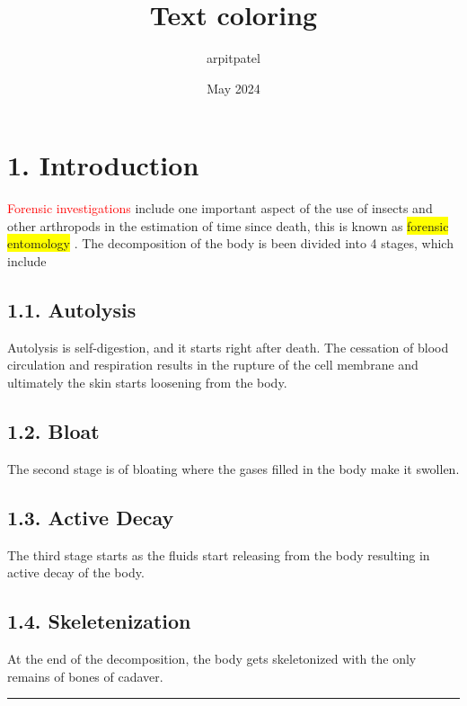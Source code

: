 \documentclass{article}
\title{\textbf{Text coloring}}
\author{arpitpatel }
\date{May 2024}
\begin{document}
\maketitle

\section*{1. Introduction}
\textcolor{red}{Forensic investigations} include one important aspect of the use of insects and other arthropods in the estimation of time since death, this is known as \colorbox{yellow}{forensic entomology} . The decomposition of the body is been divided into 4 stages, which include 

\subsection*{1.1. Autolysis}
Autolysis is self-digestion, and it starts right after death. The cessation of blood circulation and respiration results in the rupture of the cell membrane and ultimately the skin starts loosening from the body. 
\subsection*{1.2. Bloat}
The second stage is of bloating where the gases filled in the body make it swollen. 
\subsection*{1.3. Active Decay}
The third stage starts as the fluids start releasing from the body resulting in active decay of the body.
\subsection*{1.4. Skeletenization}
At the end of the decomposition, the body gets skeletonized with the only remains of bones of cadaver.\\

\noindent
{\color{black} \rule{\linewidth}{0.5mm}}
\end{document}
